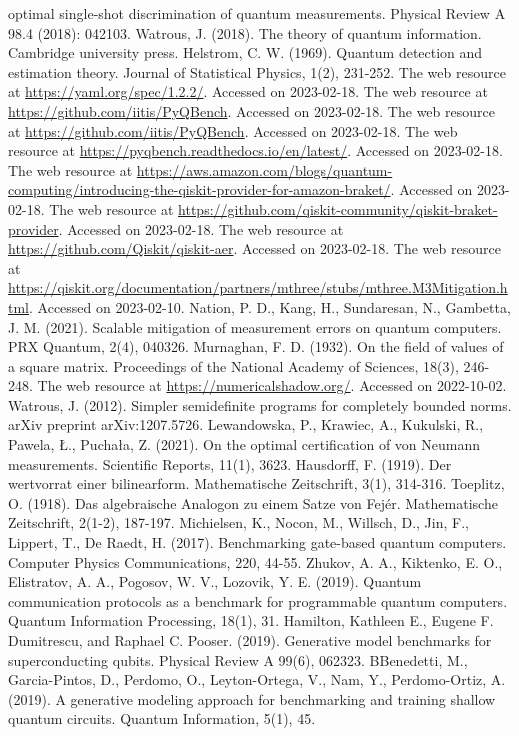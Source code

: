 \documentclass[preprint,12pt, a4paper, dvipsnames]{elsarticle}
\newcommand{\1}{{\rm 1\hspace{-0.9mm}l}}
\theoremstyle{definition}
\begin{document}
\begin{thebibliography}{00}
optimal single-shot discrimination of quantum measurements. Physical Review A
98.4 (2018): 042103.
 Watrous, J. (2018). The theory of quantum information. Cambridge university press.
 Helstrom, C. W. (1969). Quantum detection and estimation theory. Journal of Statistical Physics, 1(2), 231-252.
 The web resource at \url{https://yaml.org/spec/1.2.2/}. Accessed on 2023-02-18.
 The web resource at \url{https://github.com/iitis/PyQBench}. Accessed on 2023-02-18.
 The web resource at \url{https://github.com/iitis/PyQBench}. Accessed on 2023-02-18.
 The web resource at \url{https://pyqbench.readthedocs.io/en/latest/}. Accessed on 2023-02-18.
 The web resource at \url{https://aws.amazon.com/blogs/quantum-computing/introducing-the-qiskit-provider-for-amazon-braket/}. Accessed on 2023-02-18.
 The web resource at \url{https://github.com/qiskit-community/qiskit-braket-provider}. Accessed on 2023-02-18.
 The web resource at \url{https://github.com/Qiskit/qiskit-aer}. Accessed on 2023-02-18.
 The web resource at \url{https://qiskit.org/documentation/partners/mthree/stubs/mthree.M3Mitigation.html}. Accessed on 2023-02-10.
 Nation, P. D., Kang, H., Sundaresan, N.,  Gambetta, J. M. (2021). Scalable mitigation of measurement errors on quantum computers. PRX Quantum, 2(4), 040326.
 Murnaghan, F. D. (1932). On the field of values of a square matrix. Proceedings of the National Academy of Sciences, 18(3), 246-248.
 The web resource at \url{https://numericalshadow.org/}. Accessed on 2022-10-02.
 Watrous, J. (2012). Simpler semidefinite programs for completely bounded norms. arXiv preprint arXiv:1207.5726.
 Lewandowska, P., Krawiec, A., Kukulski, R., Pawela, Ł.,  Puchała, Z. (2021). On the optimal certification of von Neumann measurements. Scientific Reports, 11(1), 3623.
 Hausdorff, F. (1919). Der wertvorrat einer bilinearform. Mathematische Zeitschrift, 3(1), 314-316.
 Toeplitz, O. (1918). Das algebraische Analogon zu einem Satze von Fejér. Mathematische Zeitschrift, 2(1-2), 187-197.
 Michielsen, K., Nocon, M., Willsch, D., Jin, F., Lippert, T.,  De Raedt, H. (2017). Benchmarking gate-based quantum computers. Computer Physics Communications, 220, 44-55.
 Zhukov, A. A., Kiktenko, E. O., Elistratov, A. A., Pogosov, W. V.,  Lozovik, Y. E. (2019). Quantum communication protocols as a benchmark for programmable quantum computers. Quantum Information Processing, 18(1), 31.
 Hamilton, Kathleen E., Eugene F. Dumitrescu,
and Raphael C. Pooser. (2019). Generative model benchmarks for superconducting
qubits. Physical Review A 99(6), 062323.
 BBenedetti, M., Garcia-Pintos, D., Perdomo, O., Leyton-Ortega, V., Nam, Y.,  Perdomo-Ortiz, A. (2019). A generative modeling approach for benchmarking and training shallow quantum circuits. Quantum Information, 5(1), 45.


\end{thebibliography}
\end{document}
